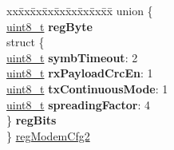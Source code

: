 \begin{DoxyCompactItemize}
\begin{tabbing}
\end{tabbing}\item 
\begin{tabbing}
xx\=xx\=xx\=xx\=xx\=xx\=xx\=xx\=xx\=\kill
union \{\\
\>\hyperlink{vl53l0x__types_8h_aba7bc1797add20fe3efdf37ced1182c5}{uint8\_t} {\bfseries regByte}\\
\>struct \{\\
\>\>\hyperlink{vl53l0x__types_8h_aba7bc1797add20fe3efdf37ced1182c5}{uint8\_t} {\bfseries symbTimeout}: 2\\
\>\>\hyperlink{vl53l0x__types_8h_aba7bc1797add20fe3efdf37ced1182c5}{uint8\_t} {\bfseries rxPayloadCrcEn}: 1\\
\>\>\hyperlink{vl53l0x__types_8h_aba7bc1797add20fe3efdf37ced1182c5}{uint8\_t} {\bfseries txContinuousMode}: 1\\
\>\>\hyperlink{vl53l0x__types_8h_aba7bc1797add20fe3efdf37ced1182c5}{uint8\_t} {\bfseries spreadingFactor}: 4\\
\>\} {\bfseries regBits}\\
\} \hyperlink{structFSK__Register__Map_ace2901b2090c4b1a80ecf5ce1f67148f}{regModemCfg2}\\


\end{tabbing}
\end{DoxyCompactItemize}
